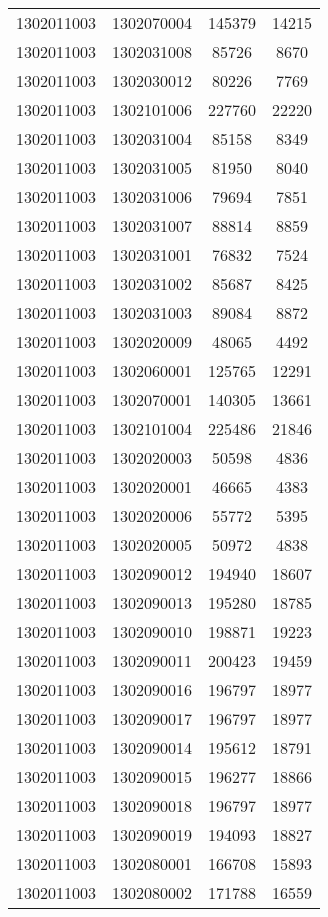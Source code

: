 \begin{longtable}[h]{llcc}
		1302011003 & 1302070004 & 145379 & 14215\\
		1302011003 & 1302031008 & 85726 & 8670\\
		1302011003 & 1302030012 & 80226 & 7769\\
		1302011003 & 1302101006 & 227760 & 22220\\
		1302011003 & 1302031004 & 85158 & 8349\\
		1302011003 & 1302031005 & 81950 & 8040\\
		1302011003 & 1302031006 & 79694 & 7851\\
		1302011003 & 1302031007 & 88814 & 8859\\
		1302011003 & 1302031001 & 76832 & 7524\\
		1302011003 & 1302031002 & 85687 & 8425\\
		1302011003 & 1302031003 & 89084 & 8872\\
		1302011003 & 1302020009 & 48065 & 4492\\
		1302011003 & 1302060001 & 125765 & 12291\\
		1302011003 & 1302070001 & 140305 & 13661\\
		1302011003 & 1302101004 & 225486 & 21846\\
		1302011003 & 1302020003 & 50598 & 4836\\
		1302011003 & 1302020001 & 46665 & 4383\\
		1302011003 & 1302020006 & 55772 & 5395\\
		1302011003 & 1302020005 & 50972 & 4838\\
		1302011003 & 1302090012 & 194940 & 18607\\
		1302011003 & 1302090013 & 195280 & 18785\\
		1302011003 & 1302090010 & 198871 & 19223\\
		1302011003 & 1302090011 & 200423 & 19459\\
		1302011003 & 1302090016 & 196797 & 18977\\
		1302011003 & 1302090017 & 196797 & 18977\\
		1302011003 & 1302090014 & 195612 & 18791\\
		1302011003 & 1302090015 & 196277 & 18866\\
		1302011003 & 1302090018 & 196797 & 18977\\
		1302011003 & 1302090019 & 194093 & 18827\\
		1302011003 & 1302080001 & 166708 & 15893\\
		1302011003 & 1302080002 & 171788 & 16559\\

\end{longtable}
